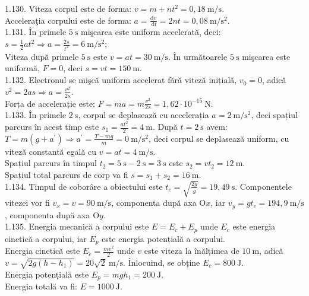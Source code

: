 1.130. Viteza corpul este de forma: $v=m+n t^{2}=0,18 \mathrm{~m} / \mathrm{s}$.\\ Acceleraţia corpului este de forma: $a=\frac{\mathrm{d} v}{\mathrm{~d} t}=2 n t=0,08 \mathrm{~m} / \mathrm{s}^{2}$.\\

1.131. În primele $5 \mathrm{~s}$ mişcarea este uniform accelerată, deci:\\ $s=\frac{1}{2} a t^{2} \Rightarrow a=\frac{2 s}{t^{2}}=6 \mathrm{~m} / \mathrm{s}^{2}$;\\ Viteza după primele $5 \mathrm{~s}$ este $v=a t=30 \mathrm{~m} / \mathrm{s}$. În următoarele $5 \mathrm{~s}$ mişcarea este uniformă, $F=0$, deci $s=v t=150 \mathrm{~m}$.\\

1.132. Electronul se mişcă uniform accelerat fără viteză inițială, $v_{0}=0$, adică $v^{2}=2 a s \Rightarrow a=\frac{v^{2}}{2 s}$.\\ Forța de accelerație este: $F=m a=m \frac{v^{2}}{2 s}=1,62 \cdot 10^{-15} \mathrm{~N}$.\\

1.133. În primele $2 \mathrm{~s}$, corpul se deplasează cu accelerația $a=2 \mathrm{~m} / \mathrm{s}^{2}$, deci spațiul parcurs în acest timp este $s_{1}=\frac{a t^{2}}{2}=4 \mathrm{~m}$. După $t=2 \mathrm{~s}$ avem:\\ $T=m\left(g+a^{\prime}\right) \Rightarrow a^{\prime}=\frac{T-m g}{m}=0 \mathrm{~m} / \mathrm{s}^{2}$, deci corpul se deplasează uniform, cu viteză constantă egală cu $v=a t=4 \mathrm{~m} / \mathrm{s}$.\\ Spațiul parcurs în timpul $t_{2}=5 \mathrm{~s}-2 \mathrm{~s}=3 \mathrm{~s}$ este $s_{2}=v t_{2}=12 \mathrm{~m}$.\\ Spațiul total parcurs de corp va fi $s=s_{1}+s_{2}=16 \mathrm{~m}$.\\

1.134. Timpul de coborâre a obiectului este $t_{c}=\sqrt{\frac{2 y}{g}}=19,49 \mathrm{~s}$. Componentele vitezei vor fi $v_{x}=v=90 \mathrm{~m} / \mathrm{s}$, componenta după axa $\mathrm{O} x$, iar $v_{y}=g t_{c}=194,9 \mathrm{~m} / \mathrm{s}$, componenta după axa $\mathrm{O} y$.\\

1.135. Energia mecanică a corpului este $E=E_{c}+E_{p}$ unde $E_{c}$ este energia cinetică a corpului, iar $E_{p}$ este energia potențială a corpului.\\ Energia cinetică este $E_{c}=\frac{m v^{2}}{2}$ unde $v$ este viteza la înălțimea de $10 \mathrm{~m}$, adică $v=\sqrt{2 g\left(h-h_{1}\right)}=20 \sqrt{2} \mathrm{~m} / \mathrm{s}$. Înlocuind, se obține $E_{c}=800 \mathrm{~J}$.\\ Energia potențială este $E_{p}=m g h_{1}=200 \mathrm{~J}$.\\ Energia totală va fi: $E=1000 \mathrm{~J}$.\\

